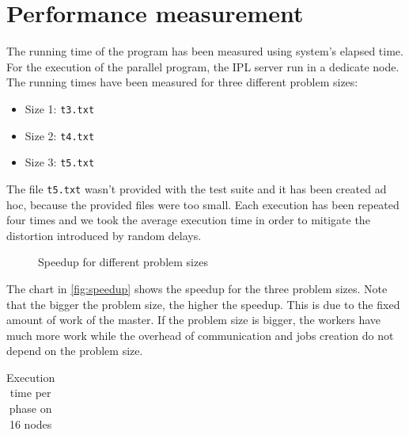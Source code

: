 \documentclass{article}
\begin{document}
\section{Performance measurement}
The running time of the program has been measured using system's elapsed time. For the execution of the parallel program, the IPL server run in a dedicate node. The running times have been measured for three different problem sizes:
\begin{itemize}
    \item Size 1: \texttt{t3.txt}
    \item Size 2: \texttt{t4.txt}
    \item Size 3: \texttt{t5.txt}
\end{itemize}
The file \texttt{t5.txt} wasn't provided with the test suite and it has been created ad hoc, because the provided files were too small. Each execution has been repeated four times and we took the average execution time in order to mitigate the distortion introduced by random delays. \\
\begin{figure}
\centering
{}
\caption{Speedup for different problem sizes} \label{fig:speedup}
\end{figure}
The chart in \autoref{fig:speedup} shows the speedup for the three problem sizes. Note that the bigger the problem size, the higher the speedup. This is due to the fixed amount of work of the master. If the problem size is bigger, the workers have much more work while the overhead of communication and jobs creation do not depend on the problem size.
\begin{table}
\centering
\begin{tabular}{|l|c|c|c|}
\hline
\end{tabular}
\caption{Execution time per phase on 16 nodes} \label{tab:timeperphasecomparison}
\end{table}
\end{document}
